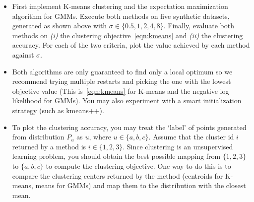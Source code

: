 \begin{itemize}
\item First implement K-means clustering and the expectation maximization algorithm for GMMs.
Execute both methods on five synthetic datasets,
generated as shown above with $\sigma \in \{0.5, 1, 2, 4, 8\}$. Finally, evaluate both methods on \emph{(i)} the clustering objective~\eqref{eqn:kmeans} and \emph{(ii)}  the clustering accuracy. For each of the two criteria, plot the value achieved by each method against $\sigma$.

\item Both algorithms are only guaranteed to find only a local optimum so we recommend trying multiple
restarts and picking the one with the lowest objective value (This is~\eqref{eqn:kmeans} for K-means and the negative log likelihood for GMMs).
You may also experiment with a smart initialization
strategy (such as kmeans++).

\item
To plot the clustering accuracy,  you may treat the `label' of points generated from distribution
$P_u$ as $u$, where $u\in \{a, b, c\}$.
Assume that the cluster id $i$ returned by a method is $i\in \{1, 2, 3\}$.
Since clustering is an unsupervised learning problem, you should obtain the best possible mapping
from $\{1, 2, 3\}$ to $\{a, b, c\}$ to compute the clustering objective.
One way to do this is to compare the clustering centers returned by the method (centroids for
K-means, means for GMMs) and map them to the distribution with the closest mean.


\end{itemize}
